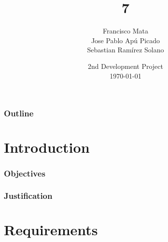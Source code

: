 \documentclass{beamer}
\title[Use of OpenCV to Send Commands]{7}
\author[Jose Pablo Apú - B10407]{
  Francisco Mata\\
  Jose Pablo Apú Picado\\
  Sebastian Ramírez Solano\\\medskip
  }
\institute[University of Costa Rica]{
  Electrical Engineering School \\
  IE-0117 - Programación Bajo Plataformas Abiertas}
\date[\today]{
  2nd Development Project \\
  \today}
\begin{document}
\begin{frame}
  \titlepage
\end{frame}

\begin{frame}
  \frametitle{Outline}
  \tableofcontents
\end{frame}

\section{Introduction}

\begin{frame}
\frametitle{Objectives}

\end{frame}
\begin{frame}
\frametitle{Justification}

\end{frame}
\section{Requirements}
\end{document}
